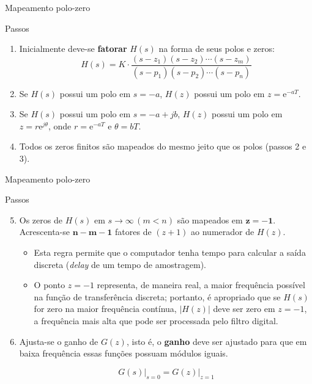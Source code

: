 \begin{frame}{Mapeamento polo-zero}
	\begin{block}{Passos}
		\begin{enumerate}
			\item Inicialmente deve-se \textbf{fatorar} $ H(s) $ na forma de seus polos e zeros:\[ H(s)=K\cdot\dfrac{(s-z_1)(s-z_2)\cdots(s-z_m)}{(s-p_1)(s-p_2)\cdots(s-p_n)} \]
			
			\item Se $ H(s) $ possui um polo em $ s=-a $, $ H(z) $ possui um polo em $ z=\text{e}^{-aT} $.
			
			\item Se $ H(s) $ possui um polo em $ s=-a+jb $, $ H(z) $ possui um polo em $ z=r\text{e}^{j\theta} $, onde $ r=\text{e}^{-aT} $  e $ \theta=bT $.
			
			\item Todos os zeros finitos são mapeados do mesmo jeito que os polos (passos 2 e 3).
		\end{enumerate}
	\end{block}
\end{frame}


\begin{frame}{Mapeamento polo-zero}
	\begin{block}{Passos}
		\begin{enumerate}
			\setcounter{enumi}{4}
			\item Os zeros de $ H(s) $ em $ s\to\infty\,(m<n) $ são mapeados em $ \bm{z=-1} $. Acrescenta-se $\bm{n-m-1}$ fatores de $(z+1)$ ao numerador de $H(z)$. 
			\begin{itemize}
			    \item Esta regra permite que o computador tenha tempo para calcular a saída discreta (\textit{delay} de um tempo de amostragem).
			    \item O ponto $z = -1$ representa, de maneira real, a maior frequência possível na função de transferência discreta; portanto, é apropriado que se $H(s)$ for zero na maior frequência contínua, $|H(z)|$ deve ser zero em $z=-1$, a frequência mais alta que pode ser processada pelo filtro digital.
			\end{itemize}
			
			
			\item Ajusta-se o ganho de $ G(z) $, isto é, o \textbf{ganho} deve ser ajustado para que em baixa frequência essas funções possuam módulos iguais.
			
			\[ G(s)\Big|_{s=0}=G(z)\Big|_{z=1} \]
		\end{enumerate}
	\end{block}
\end{frame}

